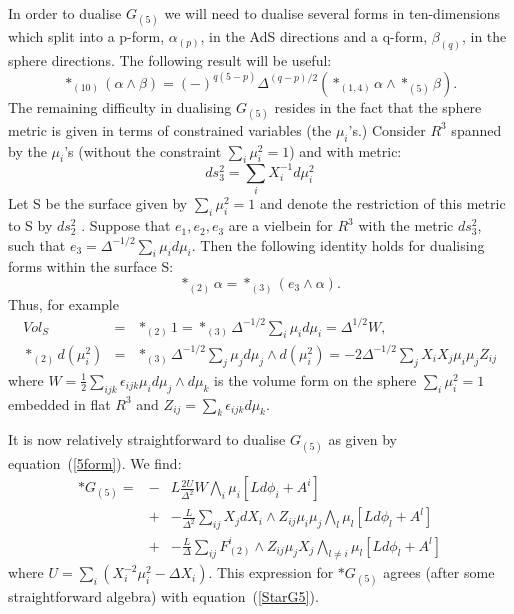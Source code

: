 \documentclass[a4paper,12pt]{article}
\begin{document}
In order to dualise  $G_{(5)}$ we will need to dualise several forms in ten-dimensions which split into a p-form, $\alpha_{(p)}$, in the AdS directions and a q-form, $\beta_{(q)}$, in the sphere directions. The following result will be useful:
\begin{equation}
  *_{(10)} (\alpha \wedge \beta) = (-)^{q(5-p)} \Delta^{(q-p)/2} (*_{(1,4)} \alpha \wedge *_{(5)} \beta).
\end{equation}
The remaining difficulty in dualising $G_{(5)}$ resides in the fact that the sphere metric is given in terms of constrained variables (the $\mu_i$'s.)
Consider $R^3$ spanned by the  $\mu_i$'s (without the constraint $\sum_i \mu_i^2 = 1$) and with metric:
\begin{equation}
  ds^2_3 = \sum_i X_i^{-1} d \mu_i^2
\end{equation}
Let S be the surface given by $\sum_i \mu_i^2 = 1$ and denote the restriction of this metric to S by  $ds^2_2$  . Suppose that $e_1, e_2, e_3$ are a vielbein for  $R^3$ with the metric $ds^2_3$, such that $e_3 = \Delta^{-1/2} \sum_i \mu_i d \mu_i$. Then the following identity holds for dualising forms within the surface S:
\begin{equation}
  *_{(2)} \alpha = *_{(3)} (e_3 \wedge \alpha ).
\end{equation}
Thus, for example
\begin{eqnarray}
  Vol_S &=&  *_{(2)} 1 =  *_{(3)} \Delta^{-1/2} \sum_i \mu_i d \mu_i = \Delta^{1/2} W, \\
 \ast_{(2)} d(\mu_i^2) &=&  *_{(3)} \Delta^{-1/2} \sum_j \mu_j d \mu_j \wedge d(\mu_i^2) = -2  \Delta^{-1/2} \sum_j X_i X_j  \mu_i \mu_j Z_{i j}
\end{eqnarray}
where $W = \frac{1}{2} \sum_{ijk} \epsilon_{ijk} \mu_i d \mu_j \wedge d \mu_k$ is the volume form on the sphere $\sum_i \mu_i^2 = 1$ embedded in flat $R^3$ and $Z_{i j} = \sum_k \epsilon_{ijk} d \mu_k$.

It is now relatively straightforward to dualise $G_{(5)}$ as given by
equation~(\ref{5form}). We find:
\begin{eqnarray}
 \ast G_{(5)} = &-& L \frac{2U}{\Delta^2} W \bigwedge_i \mu_i [L d \phi_i + A^i] \nonumber \\
&+& -\frac{L}{\Delta^2} \sum_{i j} X_j dX_i \wedge Z_{i j} \mu_i \mu_j \bigwedge_l \mu_l [L d \phi_l + A^l] \nonumber\\
&+& -\frac{L}{\Delta} \sum_{i j} F^i_{(2)} \wedge Z_{i j} \mu_j X_j \bigwedge_{l \neq i} \mu_l [L d \phi_l + A^l] \nonumber
\end{eqnarray}
where $U = \sum_i(X_i^{-2}\mu_i^2 - \Delta X_i)$. This expression for $*G_{(5)}$
agrees (after some straightforward algebra) with equation~(\ref{StarG5}).
\end{document}
